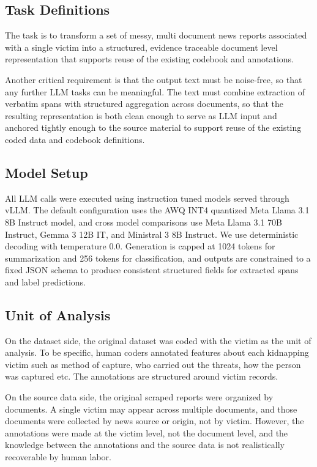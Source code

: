 \documentclass{article}
\begin{document}
\subsection{Task Definitions}\label{task-definitions}

The task is to transform a set of messy, multi document
news reports associated with a single victim into a structured, evidence
traceable document level representation that supports reuse of the
existing codebook and annotations.

Another critical requirement is that the output text must be noise-free,
so that any further LLM tasks can be meaningful. The text must combine
extraction of verbatim spans with structured aggregation across
documents, so that the resulting representation is both clean enough to
serve as LLM input and anchored tightly enough to the source material to
support reuse of the existing coded data and codebook definitions.


\subsection{Model Setup}\label{model-setup}

All LLM calls were executed using instruction tuned models served
through vLLM. The default configuration uses the AWQ INT4 quantized Meta
Llama 3.1 8B Instruct model, and cross model comparisons use Meta Llama
3.1 70B Instruct, Gemma 3 12B IT, and Ministral 3 8B Instruct. We use
deterministic decoding with temperature 0.0. Generation is capped at
1024 tokens for summarization and 256 tokens for classification, and
outputs are constrained to a fixed JSON schema to produce consistent
structured fields for extracted spans and label predictions.

\subsection{Unit of Analysis}\label{unit-of-analysis}

On the dataset side, the original dataset was coded with the victim as
the unit of analysis. To be specific, human coders annotated features
about each kidnapping victim such as method of capture, who carried out
the threats, how the person was captured etc. The annotations are
structured around victim records.

On the source data side, the original scraped reports were organized by
documents. A single victim may appear across multiple documents, and
those documents were collected by news source or origin, not by victim.
However, the annotations were made at the victim level, not the document
level, and the knowledge between the annotations and the source data is
not realistically recoverable by human labor.
\end{document}
